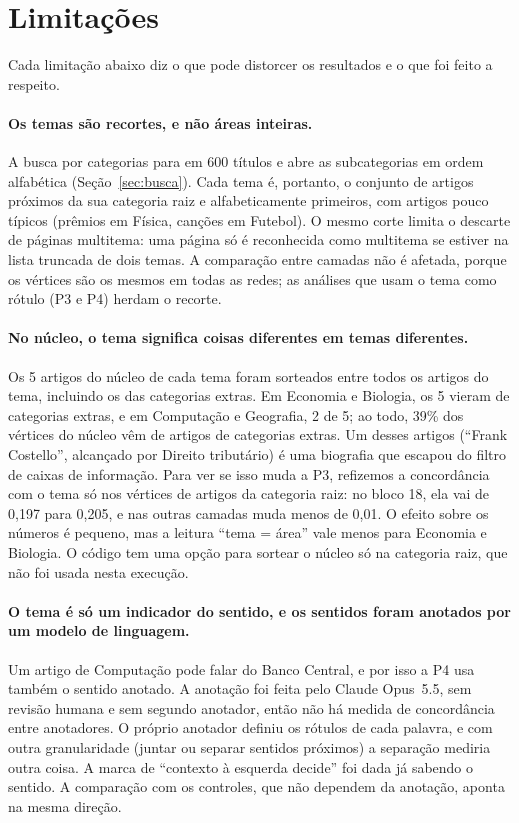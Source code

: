 \section{Limitações}\label{sec:limitacoes}

Cada limitação abaixo diz o que pode distorcer os resultados e o que foi feito a respeito.

\paragraph{Os temas são recortes, e não áreas inteiras.} A busca por categorias para em 600
títulos e abre as subcategorias em ordem alfabética (Seção~\ref{sec:busca}). Cada tema é,
portanto, o conjunto de artigos próximos da sua categoria raiz e alfabeticamente primeiros, com
artigos pouco típicos (prêmios em Física, canções em Futebol). O mesmo corte limita o descarte
de páginas multitema: uma página só é reconhecida como multitema se estiver na lista truncada
de dois temas. A comparação entre camadas não é afetada, porque os vértices são os mesmos em
todas as redes; as análises que usam o tema como rótulo (P3 e P4) herdam o recorte.

\paragraph{No núcleo, o tema significa coisas diferentes em temas diferentes.} Os 5 artigos
do núcleo de cada tema foram sorteados entre todos os artigos do tema, incluindo os das
categorias extras. Em Economia e Biologia, os 5 vieram de categorias extras, e em Computação e
Geografia, 2 de 5; ao todo, 39\% dos vértices do núcleo vêm de artigos de categorias extras.
Um desses artigos (``Frank Costello'', alcançado por Direito tributário) é uma biografia que
escapou do filtro de caixas de informação. Para ver se isso muda a P3, refizemos a concordância
com o tema só nos vértices de artigos da categoria raiz: no bloco 18, ela vai de 0,197 para
0,205, e nas outras camadas muda menos de 0,01. O efeito sobre os números é pequeno, mas a
leitura ``tema = área'' vale menos para Economia e Biologia. O código tem uma opção para
sortear o núcleo só na categoria raiz, que não foi usada nesta execução.

\paragraph{O tema é só um indicador do sentido, e os sentidos foram anotados por um modelo
de linguagem.} Um artigo de Computação pode falar do Banco Central, e por isso a P4 usa também
o sentido anotado. A anotação foi feita pelo Claude Opus~5.5, sem revisão humana e sem segundo
anotador, então não há medida de concordância entre anotadores. O próprio anotador definiu os
rótulos de cada palavra, e com outra granularidade (juntar ou separar sentidos próximos) a
separação mediria outra coisa. A marca de ``contexto à esquerda decide'' foi dada já sabendo o
sentido. A comparação com os controles, que não dependem da anotação, aponta na mesma direção.

